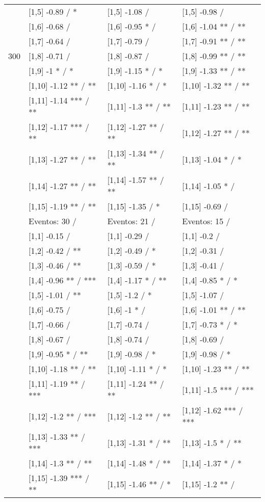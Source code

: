 \begin{table}
\begin{tabular}[t]{llll}
 & {}[1,5] -0.89  / * & {}[1,5] -1.08  / & {}[1,5] -0.98  /\\
 & {}[1,6] -0.68  / & {}[1,6] -0.95 * / & {}[1,6] -1.04 ** / **\\
 & {}[1,7] -0.64  / & {}[1,7] -0.79  / & {}[1,7] -0.91 ** / **\\
300 & {}[1,8] -0.71  / & {}[1,8] -0.87  / & {}[1,8] -0.99 ** / **\\
\addlinespace
 & {}[1,9] -1 * / * & {}[1,9] -1.15 * / * & {}[1,9] -1.33 ** / **\\
 & {}[1,10] -1.12 ** / ** & {}[1,10] -1.16 * / * & {}[1,10] -1.32 ** / **\\
 & {}[1,11] -1.14 *** / ** & {}[1,11] -1.3 ** / ** & {}[1,11] -1.23 ** / **\\
 & {}[1,12] -1.17 *** / ** & {}[1,12] -1.27 ** / ** & {}[1,12] -1.27 ** / **\\
 & {}[1,13] -1.27 ** / ** & {}[1,13] -1.34 ** / ** & {}[1,13] -1.04 * / *\\
\addlinespace
 & {}[1,14] -1.27 ** / ** & {}[1,14] -1.57 ** / ** & {}[1,14] -1.05 * /\\
 & {}[1,15] -1.19 ** / ** & {}[1,15] -1.35  / * & {}[1,15] -0.69  /\\
 & Eventos:  30 / & Eventos:  21 / & Eventos:  15 /\\
 & {}[1,1] -0.15  / & {}[1,1] -0.29  / & {}[1,1] -0.2  /\\
 & {}[1,2] -0.42  / ** & {}[1,2] -0.49  / * & {}[1,2] -0.31  /\\
\addlinespace
 & {}[1,3] -0.46  / ** & {}[1,3] -0.59  / * & {}[1,3] -0.41  /\\
 & {}[1,4] -0.96 ** / *** & {}[1,4] -1.17 * / ** & {}[1,4] -0.85 * / *\\
 & {}[1,5] -1.01  / ** & {}[1,5] -1.2  / * & {}[1,5] -1.07  /\\
 & {}[1,6] -0.75  / & {}[1,6] -1 * / & {}[1,6] -1.01 ** / **\\
 & {}[1,7] -0.66  / & {}[1,7] -0.74  / & {}[1,7] -0.73 * / *\\
\addlinespace
500 & {}[1,8] -0.67  / & {}[1,8] -0.74  / & {}[1,8] -0.69  /\\
 & {}[1,9] -0.95 * / ** & {}[1,9] -0.98  / * & {}[1,9] -0.98  / *\\
 & {}[1,10] -1.18 ** / ** & {}[1,10] -1.11 * / * & {}[1,10] -1.23 ** / **\\
 & {}[1,11] -1.19 ** / *** & {}[1,11] -1.24 ** / ** & {}[1,11] -1.5 *** / ***\\
 & {}[1,12] -1.2 ** / *** & {}[1,12] -1.2 ** / ** & {}[1,12] -1.62 *** / ***\\
\addlinespace
 & {}[1,13] -1.33 ** / *** & {}[1,13] -1.31 * / ** & {}[1,13] -1.5 * / **\\
 & {}[1,14] -1.3 ** / ** & {}[1,14] -1.48 * / ** & {}[1,14] -1.37 * / *\\
 & {}[1,15] -1.39 *** / ** & {}[1,15] -1.46 ** / * & {}[1,15] -1.2 ** /\\
\bottomrule
\end{tabular}
\end{table}

